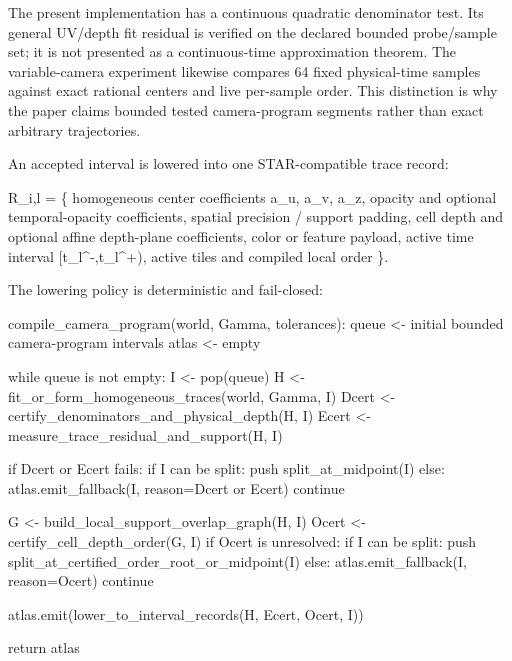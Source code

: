 \documentclass[
]{article}
\newenvironment{Shaded}{}{}
\newcommand{\NormalTok}[1]{#1}
\begin{document}
The present implementation has a continuous quadratic denominator test.
Its general UV/depth fit residual is verified on the declared bounded
probe/sample set; it is not presented as a continuous-time approximation
theorem. The variable-camera experiment likewise compares 64 fixed
physical-time samples against exact rational centers and live per-sample
order. This distinction is why the paper claims bounded tested
camera-program segments rather than exact arbitrary trajectories.

An accepted interval is lowered into one STAR-compatible trace record:

\begin{Shaded}
\begin{Highlighting}[]
\NormalTok{R\_i,l = \{}
\NormalTok{  homogeneous center coefficients a\_u, a\_v, a\_z,}
\NormalTok{  opacity and optional temporal{-}opacity coefficients,}
\NormalTok{  spatial precision / support padding,}
\NormalTok{  cell depth and optional affine depth{-}plane coefficients,}
\NormalTok{  color or feature payload,}
\NormalTok{  active time interval [t\_l\^{}{-},t\_l\^{}+),}
\NormalTok{  active tiles and compiled local order}
\NormalTok{\}.}
\end{Highlighting}
\end{Shaded}

The lowering policy is deterministic and fail-closed:

\begin{Shaded}
\begin{Highlighting}[]
\NormalTok{compile\_camera\_program(world, Gamma, tolerances):}
\NormalTok{    queue \textless{}{-} initial bounded camera{-}program intervals}
\NormalTok{    atlas \textless{}{-} empty}

\NormalTok{    while queue is not empty:}
\NormalTok{        I \textless{}{-} pop(queue)}
\NormalTok{        H \textless{}{-} fit\_or\_form\_homogeneous\_traces(world, Gamma, I)}
\NormalTok{        Dcert \textless{}{-} certify\_denominators\_and\_physical\_depth(H, I)}
\NormalTok{        Ecert \textless{}{-} measure\_trace\_residual\_and\_support(H, I)}

\NormalTok{        if Dcert or Ecert fails:}
\NormalTok{            if I can be split:}
\NormalTok{                push split\_at\_midpoint(I)}
\NormalTok{            else:}
\NormalTok{                atlas.emit\_fallback(I, reason=Dcert or Ecert)}
\NormalTok{            continue}

\NormalTok{        G \textless{}{-} build\_local\_support\_overlap\_graph(H, I)}
\NormalTok{        Ocert \textless{}{-} certify\_cell\_depth\_order(G, I)}
\NormalTok{        if Ocert is unresolved:}
\NormalTok{            if I can be split:}
\NormalTok{                push split\_at\_certified\_order\_root\_or\_midpoint(I)}
\NormalTok{            else:}
\NormalTok{                atlas.emit\_fallback(I, reason=Ocert)}
\NormalTok{            continue}

\NormalTok{        atlas.emit(lower\_to\_interval\_records(H, Ecert, Ocert, I))}

\NormalTok{    return atlas}
\end{Highlighting}
\end{Shaded}
\end{document}
